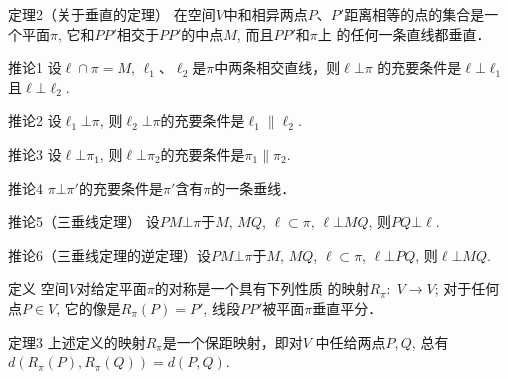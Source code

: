 \begin{blk}
    {定理2（关于垂直的定理）}
在空间$V$中和相异两点$P$、$P'$距离相等的点的集合是一
个平面$\pi$, 它和$PP'$相交于$PP'$的中点$M$, 而且$PP'$和$\pi$上
的任何一条直线都垂直．
\end{blk}

\begin{blk}
{推论1} 设$\ell\cap \pi=M$, $\ell_1$、$\ell_2$是$\pi$中两条相交直线，则$\ell\bot\pi$
的充要条件是$\ell\bot \ell_1$且$\ell\bot \ell_2$.
\end{blk}

\begin{blk}
{推论2}
设$\ell_1\bot\pi$, 则$\ell_2\bot\pi$的充要条件是$\ell_1\parallel \ell_2$.
\end{blk}

\begin{blk}
{推论3}
设$\ell\bot \pi_1$, 则$\ell\bot \pi_2$的充要条件是$\pi_1\parallel \pi_2$.
\end{blk}

\begin{blk}
{推论4}
$\pi\bot \pi'$的充要条件是$\pi'$含有$\pi$的一条垂线．

\end{blk}

\begin{blk}
    {推论5（三垂线定理）}
    设$PM\bot \pi$于$M$, $MQ$, $\ell\subset \pi$, 
$\ell\bot MQ$, 则$PQ\bot \ell$.
\end{blk}

\begin{blk}
{推论6（三垂线定理的逆定理）}设$PM\bot \pi$于$M$, $MQ$, 
$\ell\subset \pi$, $\ell\bot PQ$, 则$\ell\bot MQ$.
\end{blk}

\begin{blk}
    {定义} 空间$V$对给定平面$\pi$的对称是一个具有下列性质
的映射$R_{\pi}:\; V\to V$; 对于任何点$P\in V$, 它的像是$R_{\pi}(P)=P'$, 
线段$PP'$被平面$\pi$垂直平分．
\end{blk}

\begin{blk}
    {定理3} 上述定义的映射$R_{\pi}$是一个保距映射，即对$V$
中任给两点$P,Q$, 总有$d(R_{\pi}(P),R_{\pi}(Q))=d(P,Q)$.
\end{blk}

